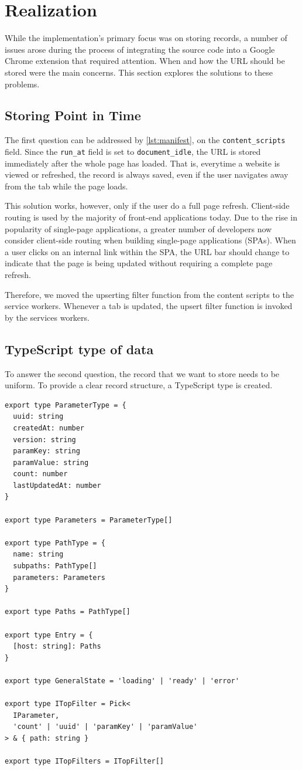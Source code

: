 \section{Realization}
While the implementation's primary focus was on storing records, a number of issues arose during the process of integrating the source code into a Google Chrome extension that required attention. When and how the URL should be stored were the main concerns. This section explores the solutions to these problems.

\subsection*{Storing Point in Time}
The first question can be addressed by \autoref{lst:manifest}, on the \verb;content_scripts; field. Since the \verb;run_at; field is set to \verb;document_idle;, the URL is stored immediately after the whole page has loaded. That is, everytime a website is viewed or refreshed, the record is always saved, even if the user navigates away from the tab while the page loads.

This solution works, however, only if the user do a full page refresh. Client-side routing is used by the majority of front-end applications today. Due to the rise in popularity of single-page applications, a greater number of developers now consider client-side routing when building single-page applications (SPAs). When a user clicks on an internal link within the SPA, the URL bar should change to indicate that the page is being updated without requiring a complete page refresh.

Therefore, we moved the upserting filter function from the content scripts to the service workers. Whenever a tab is updated, the upsert filter function is invoked by the services workers.

\subsection*{TypeScript type of data}
To answer the second question, the record that we want to store needs to be uniform. To provide a clear record structure, a TypeScript type is created.

\begin{lstlisting}[style=es6, caption={TypeScript type of a record entry (TypeScript)}]
export type ParameterType = {
  uuid: string
  createdAt: number
  version: string
  paramKey: string
  paramValue: string
  count: number
  lastUpdatedAt: number
}

export type Parameters = ParameterType[]

export type PathType = {
  name: string
  subpaths: PathType[]
  parameters: Parameters
}

export type Paths = PathType[]

export type Entry = {
  [host: string]: Paths
}

export type GeneralState = 'loading' | 'ready' | 'error'

export type ITopFilter = Pick<
  IParameter,
  'count' | 'uuid' | 'paramKey' | 'paramValue'
> & { path: string }

export type ITopFilters = ITopFilter[]
\end{lstlisting}

